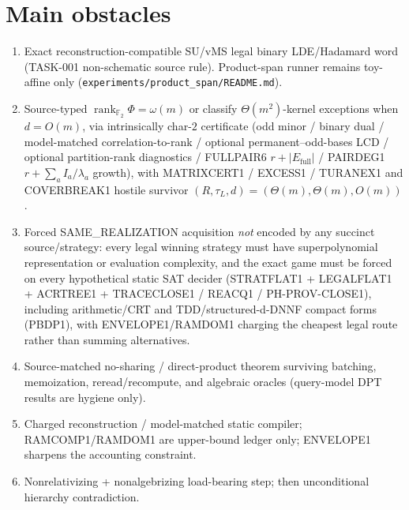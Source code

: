 \documentclass[11pt]{article}
\begin{document}
\section*{Main obstacles}
\begin{enumerate}
\item Exact reconstruction-compatible SU/vMS legal binary LDE/Hadamard word
(TASK-001 non-schematic source rule). Product-span runner remains toy-affine only
(\texttt{experiments/product\_span/README.md}).
\item Source-typed $\operatorname{rank}_{\mathbb F_2}\Phi=\omega(m)$ or classify
$\Theta(m^2)$-kernel exceptions when $d=O(m)$, via intrinsically char-$2$
certificate (odd minor / binary dual / model-matched correlation-to-rank /
optional permanent--odd-bases LCD / optional partition-rank diagnostics /
FULLPAIR6 $r+|E_{\mathrm{full}}|$ / PAIRDEG1 $r+\sum_a I_a/\lambda_a$ growth),
with MATRIXCERT1 / EXCESS1 / TURANEX1 and COVERBREAK1 hostile survivor
$(R,\tau_L,d)=(\Theta(m),\Theta(m),O(m))$.
\item Forced SAME\_REALIZATION acquisition \emph{not} encoded by any succinct
source/strategy: every legal winning strategy must have superpolynomial
representation or evaluation complexity, and the exact game must be forced on
every hypothetical static SAT decider (STRATFLAT1 + LEGALFLAT1 + ACRTREE1 +
TRACECLOSE1 / REACQ1 / PH-PROV-CLOSE1), including arithmetic/CRT and
TDD/structured-d-DNNF compact forms (PBDP1), with ENVELOPE1/RAMDOM1 charging the
cheapest legal route rather than summing alternatives.
\item Source-matched no-sharing / direct-product theorem surviving batching,
memoization, reread/recompute, and algebraic oracles (query-model DPT results
are hygiene only).
\item Charged reconstruction / model-matched static compiler; RAMCOMP1/RAMDOM1 are
upper-bound ledger only; ENVELOPE1 sharpens the accounting constraint.
\item Nonrelativizing + nonalgebrizing load-bearing step; then unconditional
hierarchy contradiction.
\end{enumerate}
\end{document}
